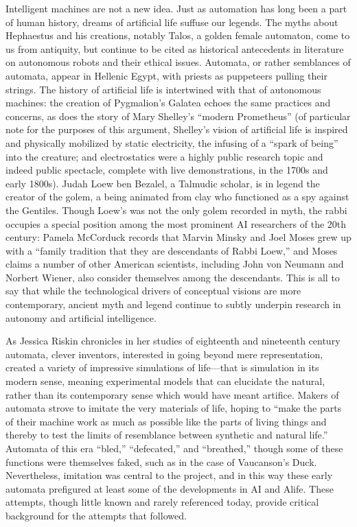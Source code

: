 Intelligent machines are not a new idea. Just as automation has long
been a part of human history, dreams of artificial life suffuse our
legends. The myths about Hephaestus and
his creations, notably Talos, a golden female automaton, come to us
from antiquity,\cite{mccorduck}  but continue to be cited as historical antecedents in
literature on autonomous robots and their ethical issues.\cite[p. 3]{patricklin} Automata,
or rather semblances of automata, appear in Hellenic Egypt, with
priests as puppeteers pulling their strings.\cite[Ch. 1]{mccorduck} The history of
artificial life is intertwined with that of autonomous machines: the
creation of Pygmalion's Galatea echoes the same practices and
concerns, as does the story of Mary Shelley's “modern Prometheus” (of
particular note for the purposes of this argument, Shelley's vision of
artificial life is inspired and physically mobilized by static
electricity, the infusing of a ``spark of being'' into the creature; and
electrostatics were a highly public research topic and indeed public
spectacle, complete with live demonstrations, in the 1700s and early
1800s).\cite[p. 44]{shelley} Judah Loew ben Bezalel, a Talmudic scholar, is in legend the
creator of the golem, a being animated from clay who functioned as a
spy against the Gentiles.\cite[Ch. 1]{mccorduck} Though Loew's was not the only golem
recorded in myth, the rabbi occupies a special position among the most
prominent AI researchers of the 20th century: Pamela McCorduck records
that Marvin Minsky and Joel Moses grew up with a ``family tradition
that they are descendants of Rabbi Loew,'' and Moses claims a number of
other American scientists, including John von Neumann and Norbert
Wiener, also consider themselves among the descendants.\cite[Ch. 1]{mccorduck} This is all
to say that while the technological drivers of conceptual visions are
more contemporary, ancient myth and legend continue to subtly underpin
research in autonomy and artificial intelligence.

As Jessica Riskin chronicles in her studies of eighteenth and
nineteenth century automata, clever inventors, interested in going
beyond mere representation, created a variety of impressive
simulations of life---that is simulation in its modern sense, meaning
experimental models that can elucidate the natural, rather than its
contemporary sense which would have meant artifice.\cite[p. ??]{riskinDuck}
Makers of automata strove to imitate the very materials of life,
hoping to ``make the parts of their machine work as much as possible
like the parts of living things and thereby to test the limits of
resemblance between synthetic and natural life.''\cite[p. ??]{riskinDuck}
Automata of this era ``bled,'' ``defecated,'' and ``breathed,'' though some
of these functions were themselves faked, such as in the case of
Vaucanson's Duck. Nevertheless, imitation was central to the project,
and in this way these early automata prefigured at least some of the
developments in AI and Alife. These attempts, though little known and
rarely referenced today, provide critical background for the attempts
that followed. 

